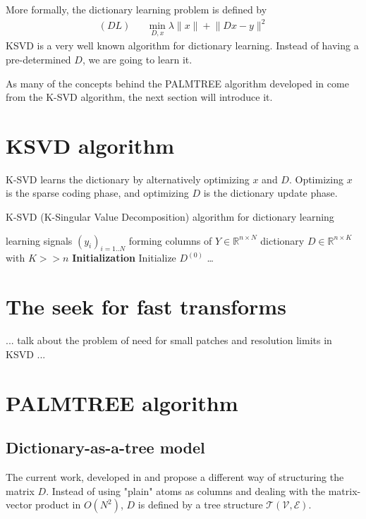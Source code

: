 More formally, the dictionary learning problem is defined by
\begin{equation*}
\begin{aligned}
(DL) && \underset{D,x}{\min} \lambda \lVert x \rVert + \lVert Dx-y \rVert^2
\end{aligned}
\end{equation*}
\ac{KSVD} is a very well known algorithm for dictionary learning. Instead of having a pre-determined $D$, we are going to learn it.

As many of the concepts behind the PALMTREE algorithm developed in \cite{chabiron_optimization_2016} come from the K-SVD algorithm, the next section will introduce it.


\section{\ac{KSVD} algorithm}


K-SVD learns the dictionary by alternatively optimizing $x$ and $D$. Optimizing $x$ is the sparse coding phase, and optimizing $D$ is the dictionary update phase.


\begin{algorithm} %
    \caption{K-SVD (K-Singular Value Decomposition) algorithm for dictionary learning}
  \begin{algorithmic}[1]
    \Input learning signals $(y_i)_{i=1..N}$ forming columns of $Y \in \mathbb{R}^{n \times N}$
    \Output dictionary $D \in \mathbb{R}^{n \times K}$ with $K>>n$
    \State \textbf{Initialization} Initialize $D^{(0)}$
	\State \dots
    \EndWhile
  \end{algorithmic}
\end{algorithm}
\section{The seek for fast transforms}
... talk about the problem of need for small patches and resolution limits in KSVD ...

\section{PALMTREE algorithm}

\subsection{Dictionary-as-a-tree model}
The current work, developed in \cite{chabiron_toward_2015} and \cite{chabiron_optimization_2016} propose a different way of structuring the matrix $D$. Instead of using "plain" atoms as columns and dealing with the matrix-vector product in $O(N^2)$, $D$ is defined by a tree structure $\mathcal{T}(\mathcal{V},\mathcal{E})$. 

